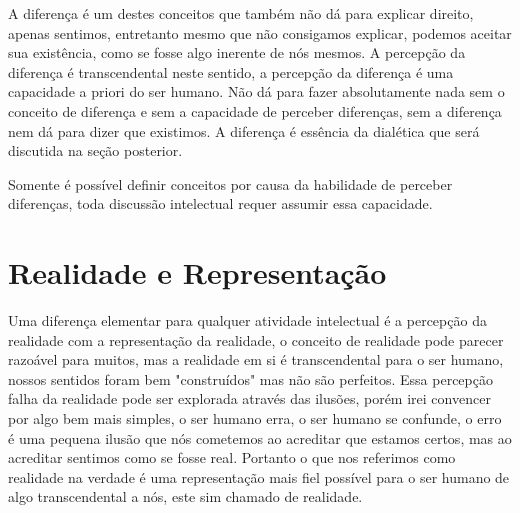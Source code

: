 \documentclass[10pt,a4paper]{report}
\begin{document}
A diferença é um destes conceitos que também não dá para explicar direito, apenas sentimos, entretanto mesmo que não consigamos explicar, podemos aceitar sua existência, como se fosse algo inerente de nós mesmos. A percepção da diferença é transcendental neste sentido, a percepção da diferença é uma capacidade a priori do ser humano. Não dá para fazer absolutamente nada sem o conceito de diferença e sem a capacidade de perceber diferenças, sem a diferença nem dá para dizer que existimos. A diferença é essência da dialética que será discutida na seção posterior. %

\hspace{\baselineskip}

Somente é possível definir conceitos por causa da habilidade de perceber diferenças, toda discussão intelectual requer assumir essa capacidade.%


\section{Realidade e Representação}

\hspace{\baselineskip}

Uma diferença elementar para qualquer atividade intelectual é a percepção da realidade com a representação da realidade, o conceito de realidade pode parecer razoável para muitos, mas a realidade em si é transcendental para o ser humano, nossos sentidos foram bem "construídos" mas não são perfeitos. Essa percepção falha da realidade pode ser explorada através das ilusões, porém irei convencer por algo bem mais simples, o ser humano erra, o ser humano se confunde, o erro é uma pequena ilusão que nós cometemos ao acreditar que estamos certos, mas ao acreditar sentimos como se fosse real. Portanto o que nos referimos como realidade na verdade é uma representação mais fiel possível para o ser humano de algo transcendental a nós, este sim chamado de realidade.
\end{document}
